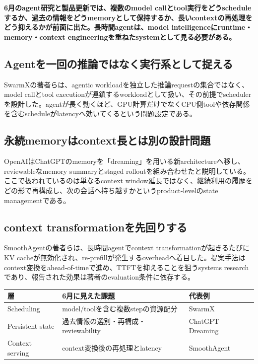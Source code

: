 \noindent\textbf{6月のagent研究と製品更新では、複数のmodel callとtool実行をどうscheduleするか、過去の情報をどうmemoryとして保持するか、長いcontextの再処理をどう抑えるかが前面に出た。長時間agentは、model intelligenceにruntime・memory・context engineeringを重ねたsystemとして見る必要がある。}\autocite{src-80f8b4d899ff,src-c3ab33c62226,src-e8d9fd84bddc}

\subsection{Agentを一回の推論ではなく実行系として捉える}

SwarmXの著者らは、agentic workloadを独立した推論requestの集合ではなく、model callとtool executionが連鎖するworkloadとして扱い、その前提でschedulerを設計した。agentが長く動くほど、GPU計算だけでなくCPU側toolや依存関係を含むscheduleがlatencyへ効いてくるという問題設定である。\autocite{src-e8d9fd84bddc}


\subsection{永続memoryはcontext長とは別の設計問題}

OpenAIはChatGPTのmemoryを「dreaming」を用いる新architectureへ移し、reviewableなmemory summaryとstaged rolloutを組み合わせたと説明している。ここで扱われているのは単なるcontext window延長ではなく、継続利用の履歴をどの形で再構成し、次の会話へ持ち越すかというproduct-levelのstate managementである。\autocite{src-c3ab33c62226}


\subsection{context transformationを先回りする}

SmoothAgentの著者らは、長時間agentでcontext transformationが起きるたびにKV cacheが無効化され、re-prefillが発生するoverheadへ着目した。提案手法はcontext変換をahead-of-timeで進め、TTFTを抑えることを狙うsystems researchであり、報告された効果は著者のevaluation条件に依存する。\autocite{src-80f8b4d899ff}


\begin{center}
\small
\begin{tabularx}{\columnwidth}{>{\raggedright\arraybackslash}X|>{\raggedright\arraybackslash}X|>{\raggedright\arraybackslash}X}
\toprule
\textbf{層} & \textbf{6月に見えた課題} & \textbf{代表例} \\
\midrule
Scheduling & model/toolを含む複数stepの資源配分 & SwarmX \\
Persistent state & 過去情報の選別・再構成・reviewability & ChatGPT Dreaming \\
Context serving & context変換後の再処理とlatency & SmoothAgent \\
\bottomrule
\end{tabularx}
\autocite{src-80f8b4d899ff,src-c3ab33c62226,src-e8d9fd84bddc}
\end{center}

